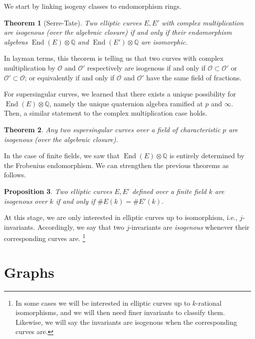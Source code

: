 \documentclass[10pt]{article}
\theoremstyle{plain}
\newtheorem{theorem}{Theorem}
\newtheorem{proposition}[theorem]{Proposition}
\theoremstyle{definition}
\DeclareMathOperator{\End}{End} %
\def\O{\ensuremath{\mathcal{O}}}
\begin{document}
We start by linking isogeny classes to endomorphism rings.

\begin{theorem}[Serre-Tate]
  \label{th:serre-tate}
  Two elliptic curves $E,E'$ with complex multiplication are isogenous
  (over the algebraic closure) if and only if their \emph{endomorphism
    algebras} $\End(E)⊗ℚ$ and $\End(E')⊗ℚ$ are isomorphic.
\end{theorem}

In layman terms, this theorem is telling us that two curves with
complex multiplication by $\O$ and $\O'$ respectively are isogenous
if and only if $\O⊂\O'$ or $\O'⊂\O$; or equivalently if and only if
$\O$ and $\O'$ have the same field of fractions.

For supersingular curves, we learned that there exists a unique
possibility for $\End(E)⊗ℚ$, namely the unique quaternion algebra
ramified at $p$ and $∞$. %
Then, a similar statement to the complex multiplication case holds.

\begin{theorem}
  \label{th:ssingular-serre-tate}
  Any two supersingular curves over a field of characteristic $p$ are
  isogenous (over the algebraic closure).
\end{theorem}

In the case of finite fields, we saw that $\End(E)⊗ℚ$ is entirely
determined by the Frobenius endomorphism. %
We can strengthen the previous theorems as follows.

\begin{proposition}
  \label{coro:serre-tate}
  Two elliptic curves $E,E'$ defined over a finite field $k$ are
  isogenous over $k$ if and only if $\#E(k)=\#E'(k)$.
\end{proposition}

At this stage, we are only interested in elliptic curves up to
isomorphism, i.e., $j$-invariants. %
Accordingly, we say that two $j$-invariants are \emph{isogenous}
whenever their corresponding curves are.%
\footnote{In some cases we will be interested in elliptic curves up to
  $k$-rational isomorphisms, and we will then need finer invariants to
  classify them. %
  Likewise, we will say the invariants are isogenous when the
  corresponding curves are.}


\section{Graphs}
\label{sec:graphs}
\end{document}
